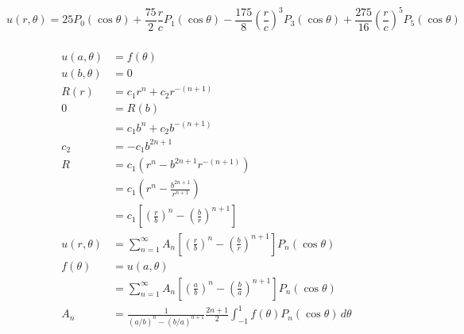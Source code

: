 \documentclass{article}
\begin{document}
\subsubsection{}

\[u(r, \theta) = 25 P_0 (\cos \theta) + \frac{75}{2} \frac{r}{c} P_1(\cos \theta) - \frac{175}{8} \left( \frac{r}{c} \right)^3 P_3(\cos \theta) + \frac{275}{16} \left( \frac{r}{c} \right)^5 P_5(\cos \theta)\]

\setcounter{subsubsection}{4}
\subsubsection{}

\begin{align*}
  u(a, \theta) & = f(\theta)                                                                                                                 \\
  u(b, \theta) & = 0                                                                                                                         \\
  R(r)         & = c_1 r^n + c_2 r^{-(n + 1)}                                                                                                \\
  0            & = R(b)                                                                                                                      \\
               & = c_1 b^n + c_2 b^{-(n + 1)}                                                                                                \\
  c_2          & = -c_1 b^{2 n + 1}                                                                                                          \\
  R            & = c_1 (r^n - b^{2 n + 1} r^{-(n + 1)})                                                                                      \\
               & = c_1 \left( r^n - \frac{b^{2 n + 1}}{r^{n + 1}} \right)                                                                    \\
               & = c_1 \left[ \left( \frac{r}{b} \right)^n - \left( \frac{b}{r} \right)^{n + 1} \right]                                      \\
  u(r, \theta) & = \sum_{n = 1}^\infty A_n \left[ \left( \frac{r}{b} \right)^n - \left( \frac{b}{r} \right)^{n + 1} \right] P_n(\cos \theta) \\
  f(\theta)    & = u(a, \theta)                                                                                                              \\
               & = \sum_{n = 1}^\infty A_n \left[ \left( \frac{a}{b} \right)^n - \left( \frac{b}{a} \right)^{n + 1} \right] P_n(\cos \theta) \\
  A_n          & = \frac{1}{(a / b)^n - (b / a)^{n + 1}} \frac{2 n + 1}{2} \int_{-1}^1 f(\theta) P_n(\cos \theta) \,d \theta
\end{align*}
\end{document}
